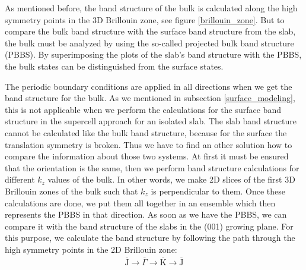 	As mentioned before, the band structure of the bulk is calculated along the high symmetry points in the 3D Brillouin zone, see figure \ref{brillouin_zone}.  
	But to compare the bulk band structure with the surface band structure from the slab, the bulk must be analyzed by using the so-called projected bulk band structure (PBBS).
	By superimposing the plots of the slab’s band structure with the PBBS, the bulk states can be distinguished from the surface states.  
	
	The periodic boundary conditions are applied in all directions when we get the band structure for the bulk. As we mentioned in subsection \ref{surface_modeling}, this is not applicable when we perform the calculations for the surface band structure in the supercell approach for an isolated slab.
	The slab band structure cannot be calculated like the bulk band structure, because for the surface the translation symmetry is broken. Thus we have to find an other solution how to compare the information about those two systems. At first it must be ensured that the orientation is the same, then we perform band structure calculations for different $k_z$ values of the bulk. In other words, we make 2D slices of the first 3D Brillouin zones of the bulk such that $k_z$ is perpendicular to them.
	Once these calculations are done, we put them all together in an ensemble which then represents the PBBS in that direction.
	As soon as we have the PBBS, we can compare it with the band structure of the slabs in the (001) growing plane. 
	For this purpose, we calculate the band structure by following the path through the high symmetry points in the 2D Brillouin zone:	
%	
	\begin{align}
		\overline{\text{J}} \rightarrow \overline{\Gamma} \rightarrow \overline{\text{K}} \rightarrow \overline{\text{J}}
	\end{align}
